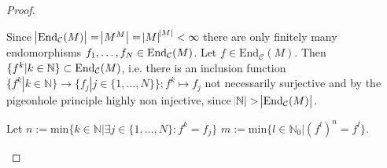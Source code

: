 \begin{proof}[Proof\nopunct]
\begin{subproof}[of (1)]

Since $\abs{\textup{End}_{\mathcal{C}}(M)} = \abs{M^{M}} = \abs{M}^{\abs{M}} < \infty$ there are only finitely many endomorphisms
$f_{1},\dots, f_{N} \in \textup{End}_{\mathcal{C}}(M)$.
Let $f \in \mathrm{End}_{\mathcal{C}}(M)$. Then $\{f^{k} | k \in \mathbb{N} \} \subset \textup{End}_{\mathcal{C}}(M)$, i.e. there is
an inclusion function $\{f^{k} | k \in \mathbb{N}\} \rightarrow \{f_{j} | j \in \{1,\dots,N\}\}; f^{k} \mapsto f_{j}$ not necessarily surjective and 
by the pigeonhole principle highly non injective, since $\abs{\mathbb{N}}>\abs{\textup{End}_{\mathcal{C}}(M)}$.


Let $n := \mathrm{min} \{ k \in \mathbb{N}| \exists j \in \{ 1,\dots,N\} : f^{k} =  f_{j} \}$
$m := \mathrm{min} \{ l \in \mathbb{N}_{0} | (f^{l})^{n} = f^{l} \}$.


\end{subproof}
\end{proof}
